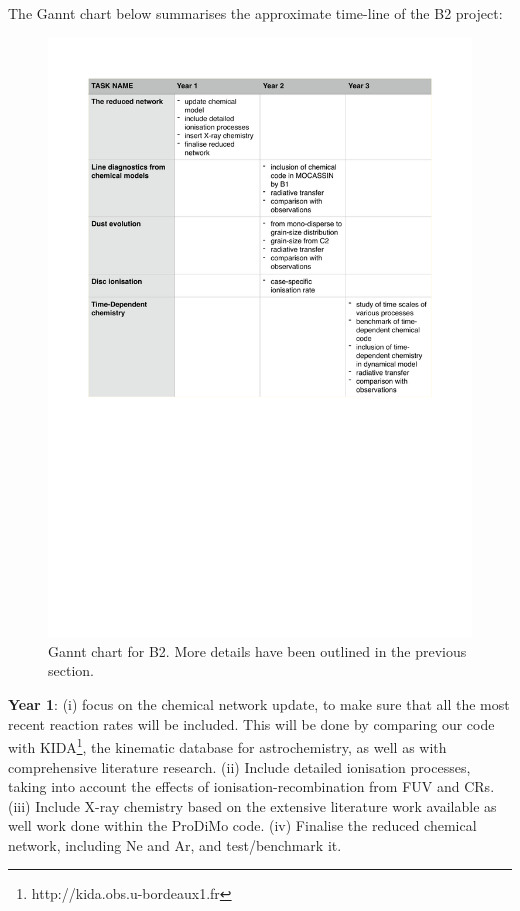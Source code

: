\documentclass[10pt,fleqn,twoside]{article}
\begin{document}
The Gannt chart below summarises the approximate time-line of the B2 project: 
 \begin{figure}[ht]
   \centering
   \includegraphics[width=\hsize]{GanntB2.pdf}
  
   \caption{Gannt chart for B2. More details have been outlined in the previous section.}
              \label{FigGam}%
    \end{figure}

{\bf Year 1}: (i) focus on the chemical network update, to make sure that all the most recent reaction rates will be included. This will be done by comparing our code with KIDA\footnote{http://kida.obs.u-bordeaux1.fr}, the kinematic database for astrochemistry, as well as with comprehensive literature research.  (ii) Include detailed ionisation processes, taking into account the effects of ionisation-recombination from FUV and CRs. (iii) Include X-ray chemistry based on the extensive literature work available as well work done within the ProDiMo code. (iv) Finalise the reduced chemical network, including Ne and Ar, and test/benchmark it. 
\end{document}
